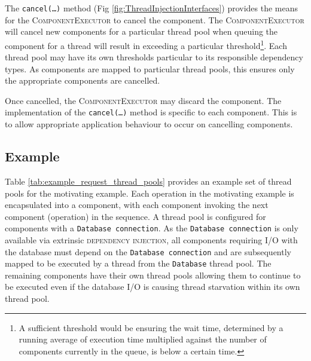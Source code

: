 \documentclass[prodmode]{style/acmlarge}
\begin{document}
The \texttt{cancel(\ldots)} method (Fig \ref{fig:ThreadInjectionInterfaces})
provides the means for the \textsc{ComponentExecutor} to cancel the component. 
The \textsc{ComponentExecutor} will cancel new components for a particular
thread pool when queuing the component for a thread will result in exceeding a
particular threshold\footnote{A sufficient threshold would be ensuring the wait
time, determined by a running average of execution time multiplied against the
number of components currently in the queue, is below a certain time.}.  Each
thread pool may have its own thresholds particular to its responsible dependency
types.  As components are mapped to particular thread pools, this ensures only
the appropriate components are cancelled.

Once cancelled, the \textsc{ComponentExecutor} may discard the component.  The
implementation of the \texttt{can\-cel(\ldots)} method is specific to each
component.  This is to allow appropriate application behaviour to occur on
cancelling components.


\subsection{Example}

Table \ref{tab:example_request_thread_pools} provides an example set of thread
pools for the motivating example.  Each operation in the motivating example is
encapsulated into a component, with each component invoking the next component
(operation) in the sequence.  A thread pool is configured for components with a
\texttt{Database connection}.  As the \texttt{Database connection} is only
available via extrinsic \textsc{dependency injection}, all components requiring
I/O with the database must depend on the \texttt{Database connection} and are
subsequently mapped to be executed by a thread from the \texttt{Database} thread
pool.  The remaining components have their own thread pools allowing them to
continue to be executed even if the database I/O is causing thread starvation
within its own thread pool.

\begin{table}[t]
\label{tab:example_request_thread_pools}
\end{table}
\end{document}
